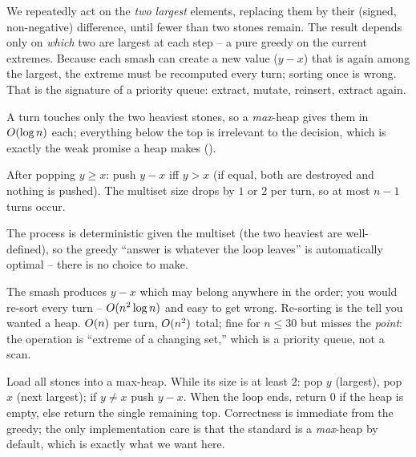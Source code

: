 We repeatedly act on the \emph{two largest} elements, replacing them by their (signed, non-negative)
difference, until fewer than two stones remain. The result depends only on \emph{which} two are largest at
each step -- a pure greedy on the current extremes. Because each smash can create a new value ($y-x$) that
is again among the largest, the extreme must be recomputed every turn; sorting once is wrong. That is the
signature of a priority queue: extract, mutate, reinsert, extract again.

\begin{observation}
A turn touches only the two heaviest stones, so a \emph{max}-heap gives them in $O(\log n)$ each;
everything below the top is irrelevant to the decision, which is exactly the weak promise a heap makes
().
\end{observation}
\begin{observation}
After popping $y\ge x$: push $y-x$ iff $y>x$ (if equal, both are destroyed and nothing is pushed). The
multiset size drops by $1$ or $2$ per turn, so at most $n-1$ turns occur.
\end{observation}
\begin{observation}
The process is deterministic given the multiset (the two heaviest are well-defined), so the greedy ``answer
is whatever the loop leaves'' is automatically optimal -- there is no choice to make.
\end{observation}

\begin{thinkbox}
{The smash produces $y-x$ which may belong anywhere in the order; you would re-sort every turn --
$O(n^2\log n)$ and easy to get wrong. Re-sorting is the tell you wanted a heap.}
{$O(n)$ per turn, $O(n^2)$ total; fine for $n\le 30$ but misses the \emph{point}: the operation is
``extreme of a changing set,'' which is a priority queue, not a scan.}
\end{thinkbox}

Load all stones into a max-heap. While its size is at least $2$: pop $y$ (largest), pop $x$ (next largest);
if $y \ne x$ push $y-x$. When the loop ends, return $0$ if the heap is empty, else return the single
remaining top. Correctness is immediate from the greedy; the only implementation care is that the standard
 is a \emph{max}-heap by default, which is exactly what we want here.

